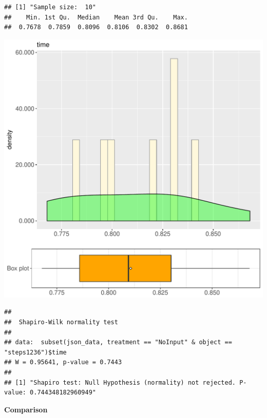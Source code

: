 \documentclass{article}\usepackage[]{graphicx}\usepackage[]{color}
\makeatletter
\def\maxwidth{ %
  \ifdim\Gin@nat@width>\linewidth
    \linewidth
  \else
    \Gin@nat@width
  \fi
}
\newenvironment{kframe}{%
 \def\at@end@of@kframe{}%
 \ifinner\ifhmode%
  \def\at@end@of@kframe{\end{minipage}}%
  \begin{minipage}{\columnwidth}%
 \fi\fi%
 \def\FrameCommand##1{\hskip\@totalleftmargin \hskip-\fboxsep
 \colorbox{shadecolor}{##1}\hskip-\fboxsep
     \hskip-\linewidth \hskip-\@totalleftmargin \hskip\columnwidth}%
 \MakeFramed {\advance\hsize-\width
   \@totalleftmargin\z@ \linewidth\hsize
   \@setminipage}}%
 {\par\unskip\endMakeFramed%
 \at@end@of@kframe}
\newenvironment{knitrout}{}{} %
\makeatother
\begin{document}
\begin{knitrout}
\color{fgcolor}\begin{kframe}
\begin{verbatim}
## [1] "Sample size:  10"
##    Min. 1st Qu.  Median    Mean 3rd Qu.    Max. 
##  0.7678  0.7859  0.8096  0.8106  0.8302  0.8681
\end{verbatim}
\end{kframe}
\includegraphics[width=\maxwidth]{figure/RH4_NoInput_steps1236-1} 
\begin{kframe}\begin{verbatim}
## 
## 	Shapiro-Wilk normality test
## 
## data:  subset(json_data, treatment == "NoInput" & object == "steps1236")$time
## W = 0.95641, p-value = 0.7443
## 
## [1] "Shapiro test: Null Hypothesis (normality) not rejected. P-value: 0.744348182960949"
\end{verbatim}
\end{kframe}
\end{knitrout}
  
 \textbf{Comparison}
  
\end{document}
